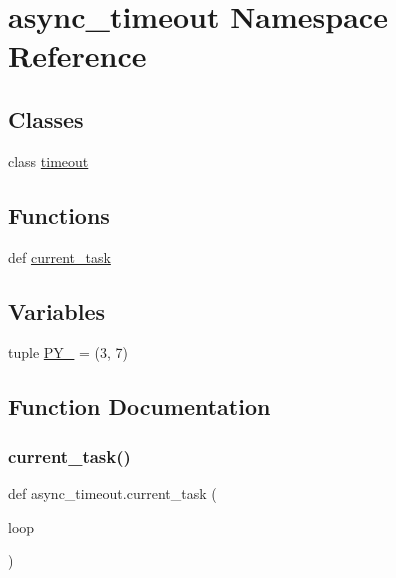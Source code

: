 \hypertarget{namespaceasync__timeout}{}\section{async\+\_\+timeout Namespace Reference}
\label{namespaceasync__timeout}
\subsection*{Classes}
\begin{DoxyCompactItemize}
\item 
class \hyperlink{classasync__timeout_1_1timeout}{timeout}
\end{DoxyCompactItemize}
\subsection*{Functions}
\begin{DoxyCompactItemize}
\item 
def \hyperlink{namespaceasync__timeout_a7405c4d90c99d370f24d10771ffd7408}{current\+\_\+task}
\end{DoxyCompactItemize}
\subsection*{Variables}
\begin{DoxyCompactItemize}
\item 
tuple \hyperlink{namespaceasync__timeout_aa89bd7671e40a708be1a9da05913bddc}{P\+Y\+\_} = (3, 7)
\end{DoxyCompactItemize}


\subsection{Function Documentation}
\mbox{\label{namespaceasync__timeout_a7405c4d90c99d370f24d10771ffd7408}} 
\subsubsection{\texorpdfstring{current\+\_\+task()}{current\_task()}}
{\footnotesize\ttfamily def async\+\_\+timeout.\+current\+\_\+task (\begin{DoxyParamCaption}\item[{}]{loop }\end{DoxyParamCaption})}



